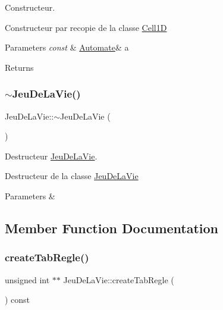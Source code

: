 Constructeur. 

Constructeur par recopie de la classe \mbox{\hyperlink{class_cell1_d}{Cell1D}}


\begin{DoxyParams}{Parameters}
{\em const} & \mbox{\hyperlink{class_automate}{Automate}}\& a \\
\hline
\end{DoxyParams}
\begin{DoxyReturn}{Returns}

\end{DoxyReturn}
\mbox{\label{class_jeu_de_la_vie_a406ed8cb7b35d3c4a0b77528473e89a4}} 
\subsubsection{\texorpdfstring{$\sim$\+Jeu\+De\+La\+Vie()}{~JeuDeLaVie()}}
{\footnotesize\ttfamily Jeu\+De\+La\+Vie\+::$\sim$\+Jeu\+De\+La\+Vie (\begin{DoxyParamCaption}{ }\end{DoxyParamCaption})}



Destructeur \mbox{\hyperlink{class_jeu_de_la_vie}{Jeu\+De\+La\+Vie}}. 

Destructeur de la classe \mbox{\hyperlink{class_jeu_de_la_vie}{Jeu\+De\+La\+Vie}}


\begin{DoxyParams}{Parameters}
{\em } & \\
\hline
\end{DoxyParams}


\subsection{Member Function Documentation}
\mbox{\label{class_jeu_de_la_vie_a8e39a4d09ea17330ac86f0500ed7380e}} 
\subsubsection{\texorpdfstring{create\+Tab\+Regle()}{createTabRegle()}}
{\footnotesize\ttfamily unsigned int $\ast$$\ast$ Jeu\+De\+La\+Vie\+::create\+Tab\+Regle (\begin{DoxyParamCaption}{ }\end{DoxyParamCaption}) const\hspace{0.3cm}{\ttfamily [virtual]}}



